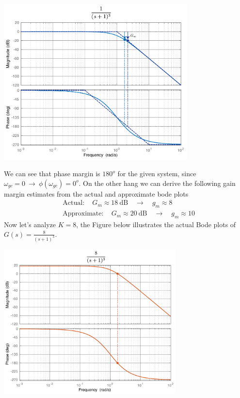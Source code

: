 \documentclass[twoside]{article}
\begin{document}
\begin{center}
\begin{minipage}[h]{\linewidth}
    \begin{center}
      \includegraphics[width=0.75\textwidth]{margin2}
    \end{center}
\end{minipage}
\end{center}

We can see that phase margin is $180^o$ for the given system,
since $\omega_{gc} = 0 \ \rightarrow \ \phi (\omega_{gc} ) = 0^o$. 
On the other hang we can derive the following gain margin estimates
from the actual and approximate bode plots
%
\begin{align*}
	&\mathrm{Actual:} \quad G_m \approx 18 \ \mathrm{dB} \quad \rightarrow \quad g_m \approx 8	
	\\
	&\mathrm{Approximate:} \quad G_m \approx 20 \ \mathrm{dB} \quad \rightarrow \quad g_m \approx 10
\end{align*}
%
Now let's analyze $K = 8$, the Figure below illustrates the
actual Bode plots of $G(s) = \frac{8}{(s+1)^3}$.


\begin{center}
\begin{minipage}[h]{\linewidth}
    \begin{center}
      \includegraphics[width=0.7\textwidth]{margin3actual}
    \end{center}
\end{minipage}
\end{center}
\end{document}
